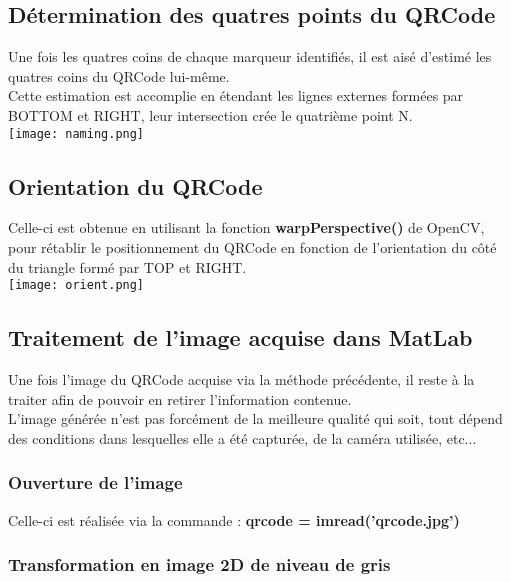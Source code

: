 \documentclass{report}
\begin{document}
		\subsection{Détermination des quatres points du QRCode}

			Une fois les quatres coins de chaque marqueur identifiés, il est aisé d'estimé les quatres coins du QRCode lui-même.\\

			Cette estimation est accomplie en étendant les lignes externes formées par BOTTOM et RIGHT, leur intersection crée le quatrième point N.\\

			\texttt{[image: naming.png]}\\

		\subsection{Orientation du QRCode}

			Celle-ci est obtenue en utilisant la fonction \textbf{warpPerspective()} de OpenCV, pour rétablir le positionnement du QRCode en fonction de l'orientation du côté du triangle formé par TOP et RIGHT.\\

			\texttt{[image: orient.png]}\\

		\subsection{Traitement de l'image acquise dans MatLab}

			Une fois l'image du QRCode acquise via la méthode précédente, il reste à la traiter afin de pouvoir en retirer l'information contenue.\\

			L'image générée n'est pas forcément de la meilleure qualité qui soit, tout dépend des conditions dans lesquelles elle a été capturée, de la caméra utilisée, etc...\\

			\subsubsection{Ouverture de l'image}

				Celle-ci est réalisée via la commande : \textbf{qrcode = imread('qrcode.jpg')}

			\subsubsection{Transformation en image 2D de niveau de gris}
\end{document}
